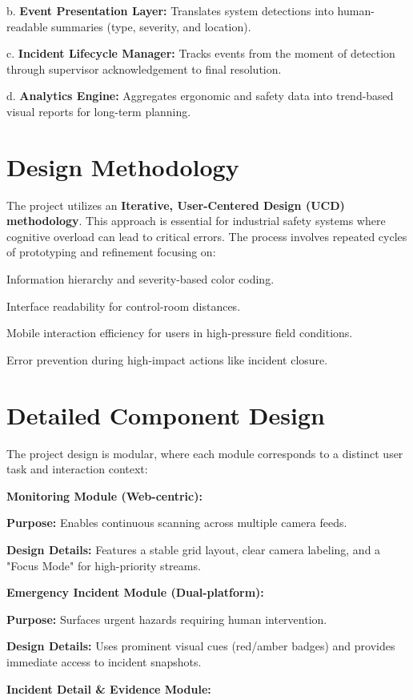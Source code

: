 b. \textbf{Event Presentation Layer:} Translates system detections into human-readable summaries (type, severity, and location).

c. \textbf{Incident Lifecycle Manager:} Tracks events from the moment of detection through supervisor acknowledgement to final resolution.

d. \textbf{Analytics Engine:} Aggregates ergonomic and safety data into trend-based visual reports for long-term planning.

\section{Design Methodology}

The project utilizes an \textbf{Iterative, User-Centered Design (UCD) methodology}. This approach is essential for industrial safety systems where cognitive overload can lead to critical errors. The process involves repeated cycles of prototyping and refinement focusing on:

Information hierarchy and severity-based color coding.

Interface readability for control-room distances.

Mobile interaction efficiency for users in high-pressure field conditions.

Error prevention during high-impact actions like incident closure.

\section{Detailed Component Design}

The project design is modular, where each module corresponds to a distinct user task and interaction context:

\textbf{Monitoring Module (Web-centric):}

\textbf{Purpose:} Enables continuous scanning across multiple camera feeds.

\textbf{Design Details:} Features a stable grid layout, clear camera labeling, and a "Focus Mode" for high-priority streams.

\textbf{Emergency Incident Module (Dual-platform):}

\textbf{Purpose:} Surfaces urgent hazards requiring human intervention.

\textbf{Design Details:} Uses prominent visual cues (red/amber badges) and provides immediate access to incident snapshots.

\textbf{Incident Detail \& Evidence Module:}

